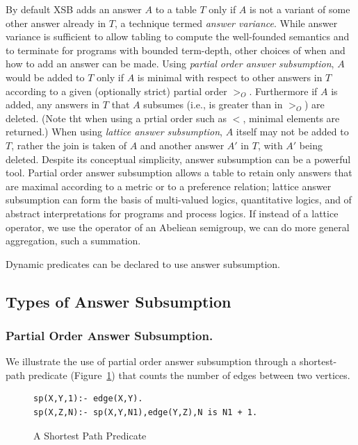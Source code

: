 %
By default XSB adds an answer $A$ to a table $T$ only if $A$ is not a
variant of some other answer already in $T$, a technique termed {\em
  answer variance}.  While answer variance is sufficient to allow
tabling to compute the well-founded semantics and to terminate for
programs with bounded term-depth, other choices of when and how to add
an answer can be made.  Using {\em partial order answer subsumption},
$A$ would be added to $T$ only if $A$ is minimal with respect to other
answers in $T$ according to a given (optionally strict) partial order
$>_O$. Furthermore if $A$ is added, any answers in $T$ that $A$
subsumes (i.e., is greater than in $>_O$) are deleted.  
(Note tht when using a prtial order such as $<$, minimal elements are returned.)
When using
{\em lattice answer subsumption}, $A$ itself may not be added to $T$,
rather the join is taken of $A$ and another answer $A'$ in $T$, with
$A'$ being deleted.  Despite its conceptual simplicity, answer
subsumption can be a powerful tool.  Partial order answer subsumption
allows a table to retain only answers that are maximal according to a
metric or to a preference relation; lattice answer subsumption can
form the basis of multi-valued logics, quantitative logics, and of
abstract interpretations for programs and process logics.  If instead
of a lattice operator, we use the operator of an Abeliean semigroup,
we can do more general aggregation, such a summation.

Dynamic predicates can be declared to use answer subsumption.
%

\subsection{Types of Answer Subsumption}

\subsubsection{Partial Order Answer Subsumption.}
% 
We illustrate the use of partial order answer subsumption through a
shortest-path predicate (Figure~\ref{fig:sp-preds}) that counts the
number of edges between two vertices.
%
\begin{figure}[htb]
{\small
\begin{verbatim}
sp(X,Y,1):- edge(X,Y).
sp(X,Z,N):- sp(X,Y,N1),edge(Y,Z),N is N1 + 1.
\end{verbatim}
} 
\caption{A Shortest Path Predicate}\label{fig:sp-preds}
\end{figure}

